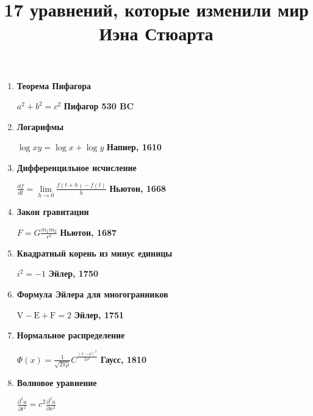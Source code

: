 \documentclass[12pt]{article}
\date{}
\title{\bf 17 уравнений, которые изменили мир Иэна Стюарта}
\begin{document}
 
	\maketitle
	\begin{enumerate}
		\item \bf{Теорема Пифагора} \hfill \begin{minipage}[t]{100mm} $ a^{2} + b^{2} = c^{2} $ \hfill \bf{Пифагор 530 BC} \end{minipage}
		\item \bf{Логарифмы}  \hfill \begin{minipage}[t]{100mm}$ \log xy  =  \log x  +  \log y $ \hfill \bf{Напиер, 1610} \end{minipage} 
		\item \bf{Дифференцильное исчисление} \hfill \begin{minipage}[t]{100mm} $ \frac{d f}{d t}  =  \lim \limits_{h\to 0} \frac{f(t+ h)-f(t)}{h} $ \hfill \bf{Ньютон, 1668} \end{minipage}
		\item   \bf{Закон гравитации} \hfill \begin{minipage}[t]{100mm}$ F = G\frac{m_{1} m_{2}}{r^2}$ \hfill \bf{Ньютон, 1687} \end{minipage}
		\item \noindent
		\begin{minipage}[t]{45mm} \bf{Квадратный корень из минус единицы} \end{minipage}
		\hfill
		\begin{minipage}[t]{100mm} $ i^{2} = - 1 $ \hfill \bf{Эйлер, 1750} \end{minipage}
		\item \noindent
		\begin{minipage}[t]{45mm} \bf{Формула Эйлера для многогранников} \end{minipage}
		\hfill 
		\begin{minipage}[t]{100mm} $ \mathrm{V} - \mathrm{E} + \mathrm{F} = 2 $ \hfill \bf{Эйлер, 1751} \end{minipage}
		\item \bf{Нормальное распределение} \hfill \begin{minipage}[t]{100mm}$ \Phi \left(x\right) = \frac{1}{\sqrt{2\pi \rho}} {C}^{\frac{(x - \rho)^{2}}{2\rho^{2}}} $ \hfill \bf{Гаусс, 1810} \end{minipage}
		\item \bf{Волновое уравнение} \hfill \begin{minipage}[t]{100mm}$  \frac{\partial^{2}u}{\partial t^{2}} = c^{2}\frac{\partial^{2}u}{\partial x^{2}} $

\end{minipage}
\end{enumerate}
\end{document}
